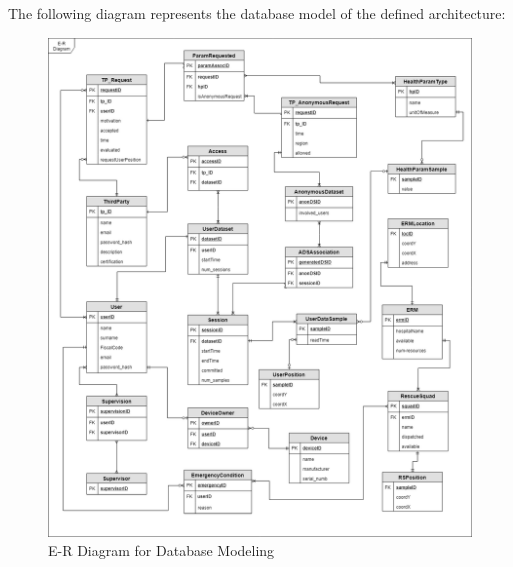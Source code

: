 \begin{flushleft}
\newpage
{}
The following diagram represents the database model of the defined architecture:
\begin{figure}[H]
	\centering
	\includegraphics[scale=0.4]{images/uml/ER_diagram.png}
	\caption{E-R Diagram for Database Modeling}
	\label{Figure 8}
\end{figure}



\end{flushleft}
